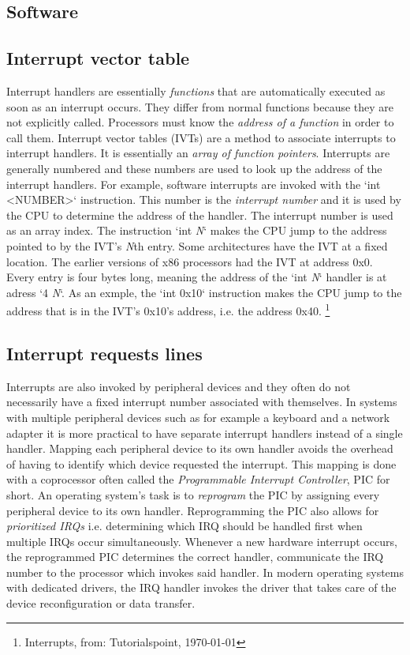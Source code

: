 \subsection{Software}

\subsection{Interrupt vector table}

Interrupt handlers are essentially \textit{functions} that are automatically executed as soon as an
interrupt occurs. They differ from normal functions because they are not explicitly called.
Processors must know the \textit{address of a function} in order to call them. Interrupt vector
tables (IVTs) are a method to associate interrupts to interrupt handlers. It is essentially an
\textit{array of function pointers}. Interrupts are generally numbered and these numbers are used to look up 
the address of the interrupt handlers. For example, software interrupts are invoked with the `int 
\textless NUMBER\textgreater` instruction. This number is the \textit{interrupt number} and it is used by the CPU to determine 
the address of the handler. The interrupt number is used as an array index. The instruction `int \textit{N}` 
makes the CPU jump to the address pointed to by the IVT's \textit{N}th entry. Some architectures have the IVT
at a fixed location. The earlier versions of x86 processors had the IVT at address 0x0. Every entry
is four bytes long, meaning the address of the `int \textit{N}` handler is at adress `4 \* \textit{N}`. As an exmple,
the `int 0x10` instruction makes the CPU jump to the address that is in the IVT's 0x10's address,
i.e. the address 0x40. \footnote{Interrupts, from: Tutorialspoint, \today }

\subsection{Interrupt requests lines}

Interrupts are also invoked by peripheral devices and they often do not necessarily have a fixed 
interrupt number associated with themselves. In systems with multiple peripheral devices such as for 
example a keyboard and a network adapter it is more practical to have separate interrupt handlers
instead of a single handler. Mapping each peripheral device to its own handler avoids the overhead of 
having to identify which device requested the interrupt. This mapping is done with a coprocessor often
called the \textit{Programmable Interrupt Controller}, PIC for short. An operating system's task is to
\textit{reprogram} the PIC by assigning every peripheral device to its own handler. Reprogramming the PIC also
allows for \textit{prioritized IRQs} i.e. determining which IRQ should be handled first when multiple IRQs 
occur simultaneously. Whenever a new hardware interrupt occurs, the reprogrammed PIC determines
the correct handler, communicate the IRQ number to the processor which invokes said handler. In
modern operating systems with dedicated drivers, the IRQ handler invokes the driver that takes
care of the device reconfiguration or data transfer.

